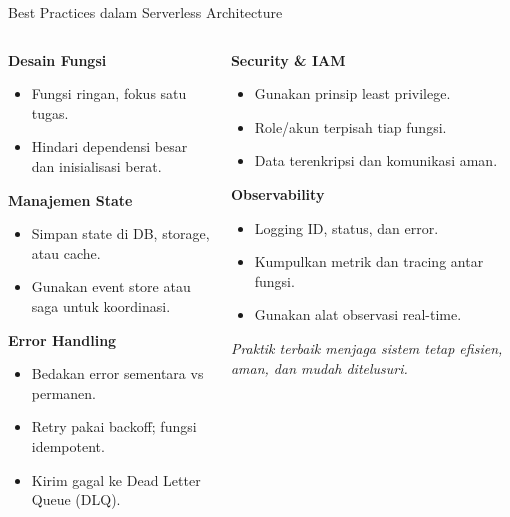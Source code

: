 \documentclass[aspectratio=169, table]{beamer}
\begin{document}
\begin{frame}[fragile]{Best Practices dalam Serverless Architecture}
	\vspace{10pt}
	\begin{columns}[T]
		\begin{column}{0.55\textwidth}
			\textbf{Desain Fungsi}
			\begin{itemize}
				\item Fungsi ringan, fokus satu tugas.
				\item Hindari dependensi besar dan inisialisasi berat.
			\end{itemize}
			
			\textbf{Manajemen State}
			\begin{itemize}
				\item Simpan state di DB, storage, atau cache.
				\item Gunakan event store atau saga untuk koordinasi.
			\end{itemize}
			
			\textbf{Error Handling}
			\begin{itemize}
				\item Bedakan error sementara vs permanen.
				\item Retry pakai backoff; fungsi idempotent.
				\item Kirim gagal ke Dead Letter Queue (DLQ).
			\end{itemize}
		\end{column}
		
		\begin{column}{0.45\textwidth}
			\textbf{Security \& IAM}
			\begin{itemize}
				\item Gunakan prinsip least privilege.
				\item Role/akun terpisah tiap fungsi.
				\item Data terenkripsi dan komunikasi aman.
			\end{itemize}
			
			\textbf{Observability}
			\begin{itemize}
				\item Logging ID, status, dan error.
				\item Kumpulkan metrik dan tracing antar fungsi.
				\item Gunakan alat observasi real-time.
			\end{itemize}
			
			\vspace{6pt}
			\scriptsize
			\textit{Praktik terbaik menjaga sistem tetap efisien, aman, dan mudah ditelusuri.}
		\end{column}
	\end{columns}
\end{frame}
\end{document}
